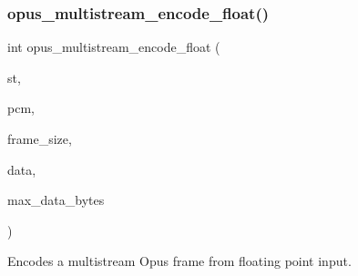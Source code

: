 \subsubsection{\texorpdfstring{opus\+\_\+multistream\+\_\+encode\+\_\+float()}{opus\_multistream\_encode\_float()}}
{\footnotesize\ttfamily int opus\+\_\+multistream\+\_\+encode\+\_\+float (\begin{DoxyParamCaption}\item[{\hyperlink{group__opus__multistream_gae5826674d142fc873ebc1d781c507dd7}{Opus\+M\+S\+Encoder} $\ast$}]{st,  }\item[{const float $\ast$}]{pcm,  }\item[{int}]{frame\+\_\+size,  }\item[{unsigned char $\ast$}]{data,  }\item[{\hyperlink{opus__types_8h_aa4d309d6f80b99dbabebc8f98879ab9a}{opus\+\_\+int32}}]{max\+\_\+data\+\_\+bytes }\end{DoxyParamCaption})}



Encodes a multistream Opus frame from floating point input. 


